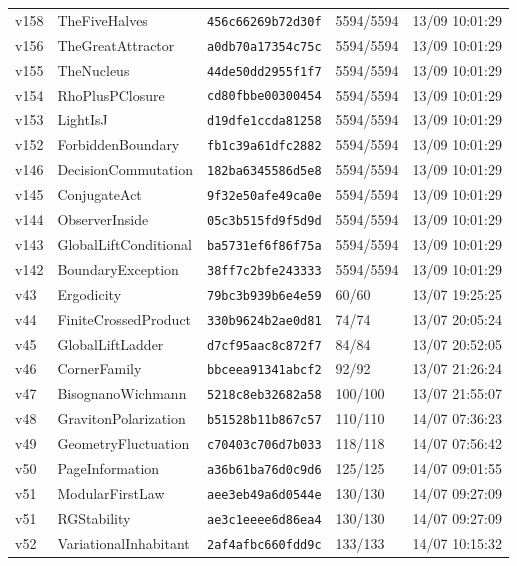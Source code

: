 \documentclass[11pt]{article}
\theoremstyle{definition}\newtheorem{deriv}{Derivação}
\begin{document}
{\begin{longtable}{@{}lllll@{}}
v158 & TheFiveHalves & \texttt{456c66269b72d30f} & 5594/5594 & 13/09 10:01:29 \\
v156 & TheGreatAttractor & \texttt{a0db70a17354c75c} & 5594/5594 & 13/09 10:01:29 \\
v155 & TheNucleus & \texttt{44de50dd2955f1f7} & 5594/5594 & 13/09 10:01:29 \\
v154 & RhoPlusPClosure & \texttt{cd80fbbe00300454} & 5594/5594 & 13/09 10:01:29 \\
v153 & LightIsJ & \texttt{d19dfe1ccda81258} & 5594/5594 & 13/09 10:01:29 \\
v152 & ForbiddenBoundary & \texttt{fb1c39a61dfc2882} & 5594/5594 & 13/09 10:01:29 \\
v146 & DecisionCommutation & \texttt{182ba6345586d5e8} & 5594/5594 & 13/09 10:01:29 \\
v145 & ConjugateAct & \texttt{9f32e50afe49ca0e} & 5594/5594 & 13/09 10:01:29 \\
v144 & ObserverInside & \texttt{05c3b515fd9f5d9d} & 5594/5594 & 13/09 10:01:29 \\
v143 & GlobalLiftConditional & \texttt{ba5731ef6f86f75a} & 5594/5594 & 13/09 10:01:29 \\
v142 & BoundaryException & \texttt{38ff7c2bfe243333} & 5594/5594 & 13/09 10:01:29 \\
v43 & Ergodicity & \texttt{79bc3b939b6e4e59} & 60/60 & 13/07 19:25:25 \\
v44 & FiniteCrossedProduct & \texttt{330b9624b2ae0d81} & 74/74 & 13/07 20:05:24 \\
v45 & GlobalLiftLadder & \texttt{d7cf95aac8c872f7} & 84/84 & 13/07 20:52:05 \\
v46 & CornerFamily & \texttt{bbceea91341abcf2} & 92/92 & 13/07 21:26:24 \\
v47 & BisognanoWichmann & \texttt{5218c8eb32682a58} & 100/100 & 13/07 21:55:07 \\
v48 & GravitonPolarization & \texttt{b51528b11b867c57} & 110/110 & 14/07 07:36:23 \\
v49 & GeometryFluctuation & \texttt{c70403c706d7b033} & 118/118 & 14/07 07:56:42 \\
v50 & PageInformation & \texttt{a36b61ba76d0c9d6} & 125/125 & 14/07 09:01:55 \\
v51 & ModularFirstLaw & \texttt{aee3eb49a6d0544e} & 130/130 & 14/07 09:27:09 \\
v51 & RGStability & \texttt{ae3c1eeee6d86ea4} & 130/130 & 14/07 09:27:09 \\
v52 & VariationalInhabitant & \texttt{2af4afbc660fdd9c} & 133/133 & 14/07 10:15:32 \\

\end{longtable}}
\end{document}
